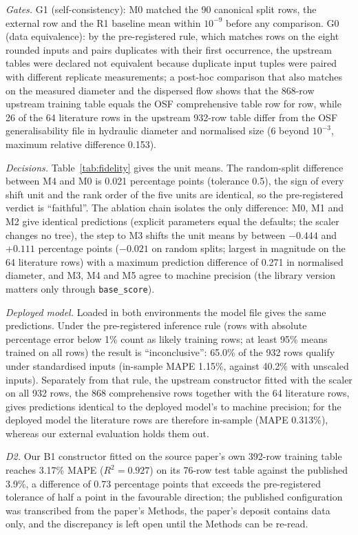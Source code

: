 \documentclass[11pt,a4paper]{article}
\begin{document}
\emph{Gates.} G1 (self-consistency): M0 matched the 90 canonical split rows,
the external row and the R1 baseline mean within $10^{-9}$ before any comparison. G0
(data equivalence): by the pre-registered rule, which matches rows on the
eight rounded inputs and pairs duplicates with their first occurrence, the
upstream tables were declared not equivalent because duplicate input tuples
were paired with different replicate measurements; a post-hoc comparison
that also matches on the measured diameter and the dispersed flow shows that
the 868-row upstream training table equals the OSF comprehensive table row
for row, while 26 of the 64 literature rows in the upstream 932-row table
differ from the OSF generalisability file in hydraulic diameter and
normalised size (6 beyond $10^{-3}$, maximum relative difference 0.153).

\emph{Decisions.} Table~\ref{tab:fidelity} gives the unit means. The
random-split difference between M4 and M0 is 0.021 percentage points
(tolerance 0.5), the sign of every shift unit and the rank order of the five
units are identical, so the pre-registered verdict is ``faithful''. The
ablation chain isolates the only difference: M0, M1 and M2 give identical
predictions (explicit parameters equal the defaults; the scaler changes no
tree), the step to M3 shifts the unit means by between $-0.444$ and $+0.111$
percentage points ($-0.021$ on random splits; largest in magnitude on the 64 literature rows) with a maximum
prediction difference of 0.271 in normalised diameter, and M3, M4 and M5
agree to machine precision (the library version matters only through
\texttt{base\_score}).

\emph{Deployed model.} Loaded in both environments the model file gives the
same predictions. Under the pre-registered inference rule (rows with
absolute percentage error below 1\% count as likely training rows; at least
95\% means trained on all rows) the result is ``inconclusive'': 65.0\% of the
932 rows qualify under standardised inputs (in-sample MAPE 1.15\%, against
40.2\% with unscaled inputs). Separately from that rule, the upstream
constructor fitted with the scaler on all 932 rows, the 868 comprehensive
rows together with the 64 literature rows, gives predictions identical to
the deployed model's to machine precision; for the deployed model the
literature rows are therefore in-sample (MAPE 0.313\%), whereas our external
evaluation holds them out.

\emph{D2.} Our B1 constructor fitted on the source paper's own 392-row
training table reaches 3.17\% MAPE ($R^2=0.927$) on its 76-row test table
against the published 3.9\%, a difference of 0.73 percentage points that
exceeds the pre-registered tolerance of half a point in the favourable
direction; the published configuration was transcribed from the paper's
Methods, the paper's deposit contains data only, and the discrepancy is left
open until the Methods can be re-read.
\end{document}
